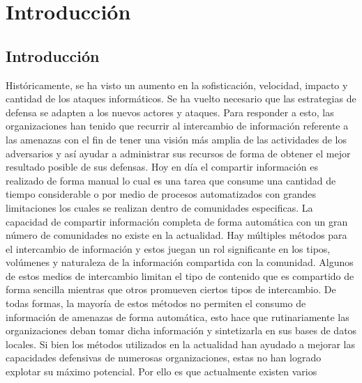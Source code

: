 
\chapter{Introducción} %

\label{hola} %

\lhead{\til}
\rhead{\fu}


\section{Introducción}
Históricamente, se ha visto un aumento en la sofisticación, velocidad, impacto y 
cantidad de los ataques informáticos. Se ha vuelto necesario que las estrategias 
de defensa se adapten a los nuevos actores y ataques. Para responder a esto, las 
organizaciones han tenido que recurrir al intercambio de información referente a 
las amenazas con el fin de tener una visión más amplia de las actividades de los 
adversarios y así ayudar a administrar sus recursos de forma de obtener el mejor 
resultado posible de sus defensas. Hoy en día el compartir información es realizado 
de forma manual lo cual es una tarea que consume una cantidad de tiempo 
considerable o por medio de procesos automatizados con grandes limitaciones los 
cuales se realizan dentro de comunidades especificas. La capacidad de compartir 
información completa de forma automática con un gran número de comunidades no 
existe en la actualidad. Hay múltiples métodos para el intercambio de 
información y estos juegan un rol significante en los tipos, volúmenes y 
naturaleza de la información compartida con la comunidad. Algunos de estos 
medios de intercambio limitan el tipo de contenido que es compartido de forma 
sencilla mientras que otros promueven ciertos tipos de intercambio. De todas 
formas, la mayoría de estos métodos no permiten el consumo de información de 
amenazas de forma automática, esto hace que rutinariamente las 
organizaciones deban tomar dicha información y sintetizarla en sus bases de 
datos locales. Si bien los métodos utilizados en la actualidad han ayudado a 
mejorar las capacidades defensivas de numerosas organizaciones, estas no han 
logrado explotar su máximo potencial. Por ello es que actualmente existen varios 

